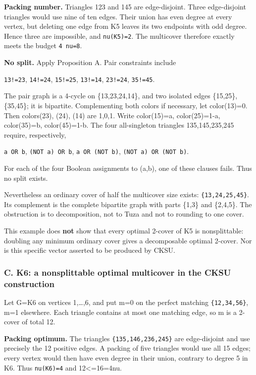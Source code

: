 \documentclass[11pt]{article}
\begin{document}
\textbf{Packing number.} Triangles 123 and 145 are edge-disjoint. Three edge-disjoint triangles would use nine of ten edges. Their union has even degree at every vertex, but deleting one edge from K5 leaves its two endpoints with odd degree. Hence three are impossible, and \texttt{nu(K5)=2}. The multicover therefore exactly meets the budget \texttt{4\ nu=8}.

\textbf{No split.} Apply Proposition A. Pair constraints include

\texttt{13!=23}, \texttt{14!=24}, \texttt{15!=25}, \texttt{13!=14}, \texttt{23!=24}, \texttt{35!=45}.

The pair graph is a 4-cycle on \{13,23,24,14\}, and two isolated edges \{15,25\}, \{35,45\}; it is bipartite. Complementing both colors if necessary, let color(13)=0. Then colors(23), (24), (14) are 1,0,1. Write color(15)=a, color(25)=1-a, color(35)=b, color(45)=1-b. The four all-singleton triangles 135,145,235,245 require, respectively,

\texttt{a\ OR\ b}, \texttt{(NOT\ a)\ OR\ b}, \texttt{a\ OR\ (NOT\ b)}, \texttt{(NOT\ a)\ OR\ (NOT\ b)}.

For each of the four Boolean assignments to (a,b), one of these clauses fails. Thus no split exists.

Nevertheless an ordinary cover of half the multicover size exists: \texttt{\{13,24,25,45\}}. Its complement is the complete bipartite graph with parts \{1,3\} and \{2,4,5\}. The obstruction is to decomposition, not to Tuza and not to rounding to one cover.

This example does \textbf{not} show that every optimal 2-cover of K5 is nonsplittable: doubling any minimum ordinary cover gives a decomposable optimal 2-cover. Nor is this specific vector asserted to be produced by CKSU.

\subsubsection{C. K6: a nonsplittable optimal multicover in the CKSU construction}\label{c.-k6-a-nonsplittable-optimal-multicover-in-the-cksu-construction}

Let G=K6 on vertices 1,\ldots,6, and put m=0 on the perfect matching \texttt{\{12,34,56\}}, m=1 elsewhere. Each triangle contains at most one matching edge, so m is a 2-cover of total 12.

\textbf{Packing optimum.} The triangles \texttt{\{135,146,236,245\}} are edge-disjoint and use precisely the 12 positive edges. A packing of five triangles would use all 15 edges; every vertex would then have even degree in their union, contrary to degree 5 in K6. Thus \texttt{nu(K6)=4} and 12\textless=16=4nu.
\end{document}
